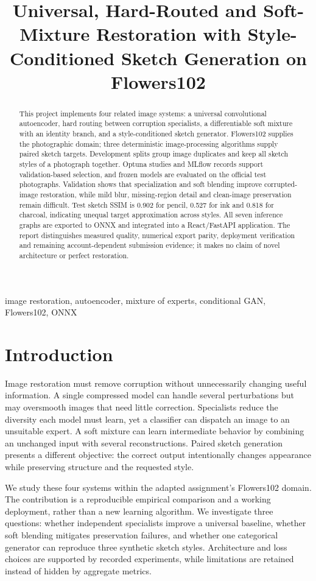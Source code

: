 \documentclass[conference]{IEEEtran}
\title{Universal, Hard-Routed and Soft-Mixture Restoration with Style-Conditioned Sketch Generation on Flowers102}
\author{\IEEEauthorblockN{Muhammad Shaffan Ahmad}
\IEEEauthorblockA{23i-0673, Section A\\CS4065 / Generative AI\\FAST NUCES}}
\begin{document}
\maketitle
\begin{abstract}
This project implements four related image systems: a universal convolutional autoencoder, hard routing between corruption specialists, a differentiable soft mixture with an identity branch, and a style-conditioned sketch generator. Flowers102 supplies the photographic domain; three deterministic image-processing algorithms supply paired sketch targets. Development splits group image duplicates and keep all sketch styles of a photograph together. Optuna studies and MLflow records support validation-based selection, and frozen models are evaluated on the official test photographs. Validation shows that specialization and soft blending improve corrupted-image restoration, while mild blur, missing-region detail and clean-image preservation remain difficult. Test sketch SSIM is 0.902 for pencil, 0.527 for ink and 0.818 for charcoal, indicating unequal target approximation across styles. All seven inference graphs are exported to ONNX and integrated into a React/FastAPI application. The report distinguishes measured quality, numerical export parity, deployment verification and remaining account-dependent submission evidence; it makes no claim of novel architecture or perfect restoration.
\end{abstract}
\begin{IEEEkeywords}image restoration, autoencoder, mixture of experts, conditional GAN, Flowers102, ONNX\end{IEEEkeywords}

\section{Introduction}
Image restoration must remove corruption without unnecessarily changing useful information. A single compressed model can handle several perturbations but may oversmooth images that need little correction. Specialists reduce the diversity each model must learn, yet a classifier can dispatch an image to an unsuitable expert. A soft mixture can learn intermediate behavior by combining an unchanged input with several reconstructions. Paired sketch generation presents a different objective: the correct output intentionally changes appearance while preserving structure and the requested style.

We study these four systems within the adapted assignment's Flowers102 domain. The contribution is a reproducible empirical comparison and a working deployment, rather than a new learning algorithm. We investigate three questions: whether independent specialists improve a universal baseline, whether soft blending mitigates preservation failures, and whether one categorical generator can reproduce three synthetic sketch styles. Architecture and loss choices are supported by recorded experiments, while limitations are retained instead of hidden by aggregate metrics.
\end{document}
